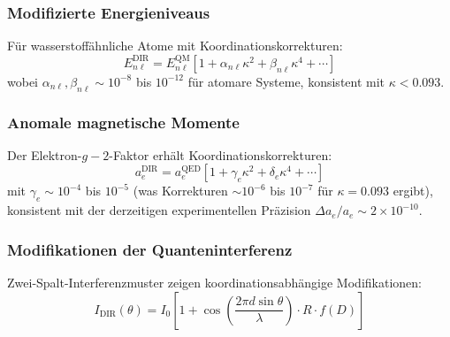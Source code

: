 \documentclass[11pt,a4paper]{article}
\begin{document}
	\subsubsection{Modifizierte Energieniveaus}
	Für wasserstoffähnliche Atome mit Koordinationskorrekturen:
	\begin{equation}
		E_{n\ell}^{\text{DIR}} = E_{n\ell}^{\text{QM}} \left[ 1 + \alpha_{n\ell} \kappa^2 + \beta_{n\ell} \kappa^4 + \cdots \right]
	\end{equation}
	wobei $\alpha_{n\ell}, \beta_{n\ell} \sim 10^{-8}$ bis $10^{-12}$ für atomare Systeme, konsistent mit $\kappa < 0.093$.
	
	\subsubsection{Anomale magnetische Momente}
	Der Elektron-$g-2$-Faktor erhält Koordinationskorrekturen:
	\begin{equation}
		a_e^{\text{DIR}} = a_e^{\text{QED}} \left[ 1 + \gamma_e \kappa^2 + \delta_e \kappa^4 + \cdots \right]
	\end{equation}
	mit $\gamma_e \sim 10^{-4}$ bis $10^{-5}$ (was Korrekturen $\sim 10^{-6}$ bis $10^{-7}$ für $\kappa=0.093$ ergibt),
	konsistent mit der derzeitigen experimentellen Präzision $\Delta a_e/a_e \sim 2\times10^{-10}$.
	
	\subsubsection{Modifikationen der Quanteninterferenz}
	Zwei-Spalt-Interferenzmuster zeigen koordinationsabhängige Modifikationen:
	\begin{equation}
		I_{\text{DIR}}(\theta) = I_0 \left[ 1 + \cos\left( \frac{2\pi d \sin\theta}{\lambda} \right) \cdot R \cdot f(D) \right]
	\end{equation}
	
\end{document}
